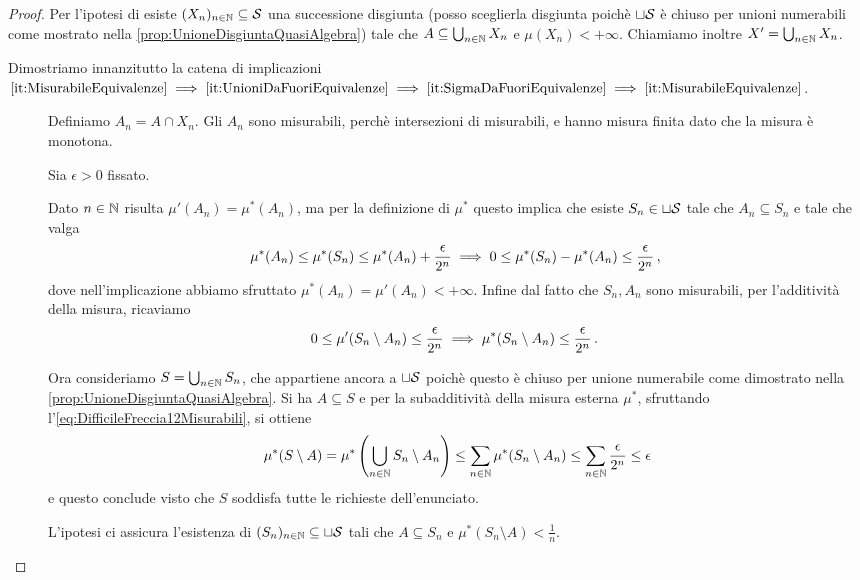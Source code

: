 \begin{proof}
	Per l'ipotesi di \sigfin[ezza] esiste $(X_n)_{n\in\N}\subseteq \S$ una successione disgiunta (posso sceglierla disgiunta poichè $\sqcup\S$ è chiuso per unioni numerabili come mostrato nella \cref{prop:UnioneDisgiuntaQuasiAlgebra}) tale che $A\subseteq \bigcup_{n\in\N}X_n$ e $\mu(X_n)<+\infty$. Chiamiamo inoltre $X'=\bigcup_{n\in\N}X_n$.
	
	Dimostriamo innanzitutto la catena di implicazioni
	$\text{\ref{it:MisurabileEquivalenze}}\implies
	\text{\ref{it:UnioniDaFuoriEquivalenze}}\implies
	\text{\ref{it:SigmaDaFuoriEquivalenze}}\implies
	\text{\ref{it:MisurabileEquivalenze}}$.
	\begin{description}
		\item[] Definiamo $A_n=A\cap X_n$. Gli $A_n$ sono misurabili, perchè intersezioni di misurabili, e hanno misura finita dato che la misura è monotona.
		
		Sia $\epsilon>0$ fissato.
		
		Dato $n\in\N$ risulta $\mu'(A_n)=\mu^*(A_n)$, ma per la definizione di $\mu^*$ questo implica che esiste $S_n\in\sqcup \S$ tale che $A_n\subseteq S_n$ e tale che valga
		\begin{equation*}
			\mu^*(A_n)\le \mu^*(S_n) \le \mu^*(A_n)+\frac\epsilon{2^n}\implies
			0\le \mu^*(S_n)-\mu^*(A_n)\le \frac\epsilon{2^n} \virgola
		\end{equation*}
		dove nell'implicazione abbiamo sfruttato $\mu^*(A_n)=\mu'(A_n)<+\infty$.
		Infine dal fatto che $S_n,A_n$ sono misurabili, per l'additività della misura, ricaviamo
		\begin{equation}\label{eq:DifficileFreccia12Misurabili}
			0\le \mu'(S_n\setminus A_n) \le \frac\epsilon{2^n} \implies \mu^*(S_n\setminus A_n)\le \frac\epsilon{2^n}\punto
		\end{equation}
		
		Ora consideriamo $S=\bigcup_{n\in\N}S_n$, che appartiene ancora a $\sqcup\S$ poichè questo è chiuso per unione numerabile come dimostrato nella \cref{prop:UnioneDisgiuntaQuasiAlgebra}. Si ha $A\subseteq S$ e per la subadditività della misura esterna  $\mu^*$, sfruttando l'\cref{eq:DifficileFreccia12Misurabili}, si ottiene
		\begin{equation*}
			\mu^*(S\setminus A)=\mu^*\left(\bigcup_{n\in\N}S_n\setminus A_n\right)\le
			\sum_{n\in\N}\mu^*(S_n\setminus A_n)\le\sum_{n\in\N}\frac\epsilon{2^n}\le \epsilon
		\end{equation*}
		e questo conclude visto che $S$ soddisfa tutte le richieste dell'enunciato.
		\item[] L'ipotesi ci assicura l'esistenza di $(S_n)_{n\in\N}\subseteq \sqcup \S$ tali che $A\subseteq S_n$ e $\mu^*(S_n\setminus A)<\frac1n$.
		

\end{description}
\end{proof}
